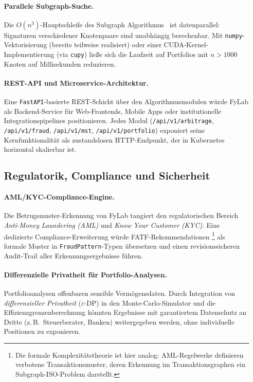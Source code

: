 \documentclass[a4paper,12pt]{article}
\begin{document}
\paragraph{Parallele Subgraph-Suche.}
Die $O(n^3)$-Hauptschleife des Subgraph Algorithmus~ \cite{subgraph}
ist datenparallel: Signaturen verschiedener Knotenpaare sind unabhängig
berechenbar. Mit \texttt{numpy}-Vektorisierung (bereits teilweise realisiert)
oder einer CUDA-Kernel-Implemen\-tierung (via \texttt{cupy}) ließe sich die
Laufzeit auf Portfolios mit $n > 1000$ Knoten auf Millisekunden reduzieren.

\paragraph{REST-API und Microservice-Architektur.}
Eine \texttt{FastAPI}-basierte REST-Schicht über den Algorithmusmodulen würde
FyLab als Backend-Service für Web-Frontends, Mobile Apps oder
institutionelle Integrationspipelines positionieren. Jedes Modul
(\texttt{/api/v1/\newline arbitrage}, \texttt{/api/v1/fraud}, \texttt{/api/v1/mst},
\texttt{/api/v1/portfolio}) exponiert seine Kernfunktionalität als
zustandslosen HTTP-Endpunkt, der in Kubernetes horizontal skalierbar ist.

\subsection{Regulatorik, Compliance und Sicherheit}
\label{sub:ausblick_regulatorik}

\paragraph{AML/KYC-Compliance-Engine.}
Die Betrugsmuster-Erkennung von FyLab tangiert den regulatorischen Bereich
\emph{Anti-Money Laundering (AML)} und \emph{Know Your Customer (KYC)}.
Eine dedizierte Compliance-Erweiterung würde FATF-Rekommendationen
\cite{garey1979}\footnote{Die formale Komplexitätstheorie ist hier analog:
AML-Regelwerke definieren verbotene Transaktionsmuster, deren Erkennung
im Transaktionsgraphen ein Subgraph-ISO-Problem darstellt.}
als formale Muster in \texttt{FraudPattern}-Typen übersetzen und
einen revisionssicheren Audit-Trail aller Erkennungsergebnisse führen.

\paragraph{Differenzielle Privatheit für Portfolio-Analysen.}
Portfolioanalysen offenbaren sensible Vermögensdaten. Durch Integration
von \emph{differenzieller Privatheit} ($\varepsilon$-DP) in den
Monte-Carlo-Simulator und die Effizienzgrenzenberechnung könnten
Ergebnisse mit garantiertem Datenschutz an Dritte (z.\,B.\ Steuerberater,
Banken) weitergegeben werden, ohne individuelle Positionen zu exponieren.
\end{document}
